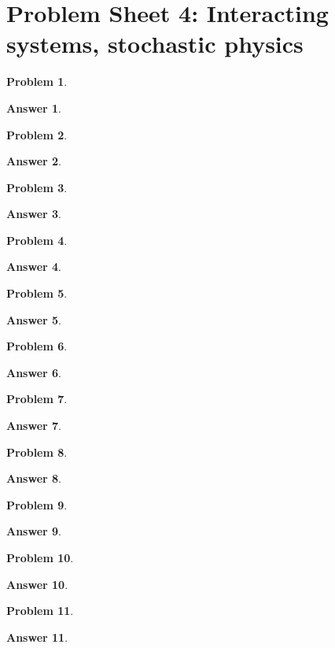 \documentclass[a4paper]{article}
\newtheorem{ans}{Answer}[section]
\theoremstyle{new}
\newtheorem{qns}{Problem}[section]
\begin{document}
\section{Problem Sheet 4: Interacting systems, stochastic physics}
\begin{qns}

\end{qns}
\begin{ans}

\end{ans}
\begin{qns}

\end{qns}
\begin{ans}

\end{ans}
\newpage
\begin{qns}

\end{qns}
\begin{ans}

\end{ans}
\begin{qns}

\end{qns}
\begin{ans}

\end{ans}
\newpage
\begin{qns}

\end{qns}
\begin{ans}

\end{ans}
\begin{qns}

\end{qns}
\begin{ans}

\end{ans}
\newpage
\begin{qns}

\end{qns}
\begin{ans}

\end{ans}
\begin{qns}

\end{qns}
\begin{ans}

\end{ans}
\newpage
\begin{qns}

\end{qns}
\begin{ans}

\end{ans}
\begin{qns}

\end{qns}
\begin{ans}

\end{ans}
\begin{qns}

\end{qns}
\begin{ans}

\end{ans}
\end{document}
